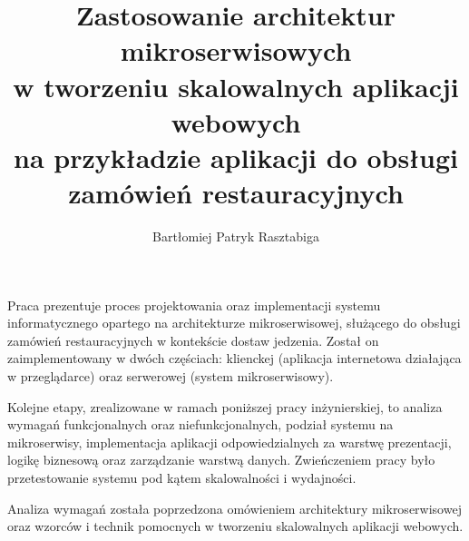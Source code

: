 \documentclass[
    bindingoffset=5mm,  %
    footnoteindent=3mm, %
    hyphenation=true    %
]{src/wut-thesis}
\begin{document}

\title{
    Zastosowanie architektur mikroserwisowych\\
    w tworzeniu skalowalnych aplikacji webowych\\ 
    na przykładzie aplikacji do obsługi zamówień restauracyjnych
}
\author{Bartłomiej Patryk Rasztabiga}
\date{\the\year}
\maketitle

\cleardoublepage %
\abstract

Praca prezentuje proces projektowania oraz implementacji systemu informatycznego opartego na architekturze mikroserwisowej, służącego do obsługi zamówień restauracyjnych w kontekście dostaw jedzenia. Został on zaimplementowany w dwóch częściach: klienckej (aplikacja internetowa działająca w przeglądarce) oraz serwerowej (system mikroserwisowy).

Kolejne etapy, zrealizowane w ramach poniższej pracy inżynierskiej, to analiza wymagań funkcjonalnych oraz niefunkcjonalnych, podział systemu na mikroserwisy, implementacja aplikacji odpowiedzialnych za warstwę prezentacji, logikę biznesową oraz zarządzanie warstwą danych. Zwieńczeniem pracy było przetestowanie systemu pod kątem skalowalności i wydajności.

Analiza wymagań została poprzedzona omówieniem architektury mikroserwisowej oraz wzorców i technik pomocnych w tworzeniu skalowalnych aplikacji webowych.
\end{document}
